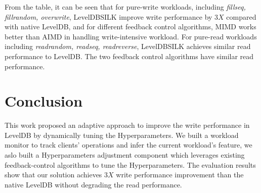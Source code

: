 \documentclass[letter,twocolumn,10pt]{article}
\begin{document}
From the table, it can be seen that for pure-write workloads, including \textit{fillseq, fillrandom, overwrite}, LevelDBSILK improve write performance by $3X$ compared with native LevelDB, and for different feedback control algorithms, MIMD works better than AIMD in handling write-intensive workload. For pure-read workloads including \textit{readrandom, readseq, readreverse}, LevelDBSILK achieves similar read performance to LevelDB. The two feedback control algorithms have similar read performance.
\section{Conclusion}
\label{sec:conclusion}
This work proposed an adaptive approach to improve the write performance in LevelDB by dynamically tuning the Hyperparameters. We built a workload monitor to track clients' operations and infer the current workload's feature, we aslo built a Hyperparameters adjustment component which leverages existing feedback-control algorithms to tune the Hyperparameters. The evaluation results show that our solution achieves $3X$ write performance improvement than the native LevelDB without degrading the read performance. 

{\footnotesize 


}
\end{document}
